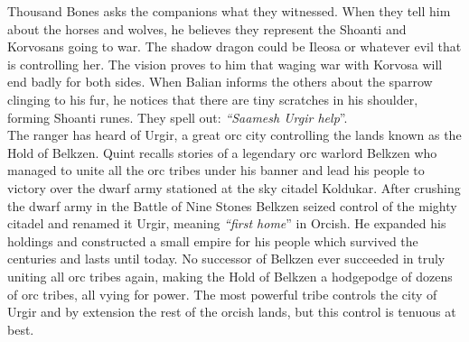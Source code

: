 Thousand Bones asks the companions what they witnessed. When they tell him about the horses and wolves, he believes they represent the Shoanti and Korvosans going to war. The shadow dragon could be Ileosa or whatever evil that is controlling her. The vision proves to him that waging war with Korvosa will end badly for both sides. When Balian informs the others about the sparrow clinging to his fur, he notices that there are tiny scratches in his shoulder, forming Shoanti runes. They spell out: {\itshape``Saamesh Urgir help}''.\\

The ranger has heard of Urgir, a great orc city controlling the lands known as the Hold of Belkzen. Quint recalls stories of a legendary orc warlord Belkzen who managed to unite all the orc tribes under his banner and lead his people to victory over the dwarf army stationed at the sky citadel Koldukar. After crushing the dwarf army in the Battle of Nine Stones Belkzen seized control of the mighty citadel and renamed it Urgir, meaning {\itshape``first home}'' in Orcish. He expanded his holdings and constructed a small empire for his people which survived the centuries and lasts until today. No successor of Belkzen ever succeeded in truly uniting all orc tribes again, making the Hold of Belkzen a hodgepodge of dozens of orc tribes, all vying for power. The most powerful tribe controls the city of Urgir and by extension the rest of the orcish lands, but this control is tenuous at best.\\


